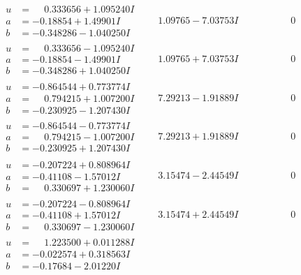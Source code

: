 \documentclass[1p]{elsarticle_modified}
\theoremstyle{definition}
\begin{document}
$$\begin{array}{c|c|c}
\begin{aligned}
u &= \phantom{-}0.333656 + 1.095240 I \\
a &= -0.18854 + 1.49901 I \\
b &= -0.348286 - 1.040250 I\end{aligned}
 & \phantom{-}1.09765 - 7.03753 I & \phantom{-0.000000 } 0 \\ \hline\begin{aligned}
u &= \phantom{-}0.333656 - 1.095240 I \\
a &= -0.18854 - 1.49901 I \\
b &= -0.348286 + 1.040250 I\end{aligned}
 & \phantom{-}1.09765 + 7.03753 I & \phantom{-0.000000 } 0 \\ \hline\begin{aligned}
u &= -0.864544 + 0.773774 I \\
a &= \phantom{-}0.794215 + 1.007200 I \\
b &= -0.230925 - 1.207430 I\end{aligned}
 & \phantom{-}7.29213 - 1.91889 I & \phantom{-0.000000 } 0 \\ \hline\begin{aligned}
u &= -0.864544 - 0.773774 I \\
a &= \phantom{-}0.794215 - 1.007200 I \\
b &= -0.230925 + 1.207430 I\end{aligned}
 & \phantom{-}7.29213 + 1.91889 I & \phantom{-0.000000 } 0 \\ \hline\begin{aligned}
u &= -0.207224 + 0.808964 I \\
a &= -0.41108 - 1.57012 I \\
b &= \phantom{-}0.330697 + 1.230060 I\end{aligned}
 & \phantom{-}3.15474 - 2.44549 I & \phantom{-0.000000 } 0 \\ \hline\begin{aligned}
u &= -0.207224 - 0.808964 I \\
a &= -0.41108 + 1.57012 I \\
b &= \phantom{-}0.330697 - 1.230060 I\end{aligned}
 & \phantom{-}3.15474 + 2.44549 I & \phantom{-0.000000 } 0 \\ \hline\begin{aligned}
u &= \phantom{-}1.223500 + 0.011288 I \\
a &= -0.022574 + 0.318563 I \\
b &= -0.17684 - 2.01220 I\end{aligned}

\end{array}$$
\end{document}
